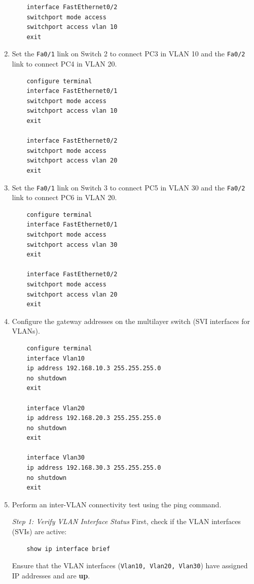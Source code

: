 \documentclass[a4paper]{book}
\begin{document}
\begin{enumerate}
\begin{lstlisting}
    interface FastEthernet0/2
    switchport mode access
    switchport access vlan 10
    exit
    \end{lstlisting}
    \item Set the \texttt{Fa0/1} link on Switch 2 to connect PC3 in VLAN 10 and the \texttt{Fa0/2} link to connect PC4 in VLAN 20.
    \begin{lstlisting}
    configure terminal
    interface FastEthernet0/1
    switchport mode access
    switchport access vlan 10
    exit

    interface FastEthernet0/2
    switchport mode access
    switchport access vlan 20
    exit
    \end{lstlisting}
    \item Set the \texttt{Fa0/1} link on Switch 3 to connect PC5 in VLAN 30 and the \texttt{Fa0/2} link to connect PC6 in VLAN 20.
    \begin{lstlisting}
    configure terminal
    interface FastEthernet0/1
    switchport mode access
    switchport access vlan 30
    exit
        
    interface FastEthernet0/2
    switchport mode access
    switchport access vlan 20
    exit
    \end{lstlisting}
    \item Configure the gateway addresses on the multilayer switch (SVI interfaces for VLANs).
    \begin{lstlisting}
    configure terminal
    interface Vlan10
    ip address 192.168.10.3 255.255.255.0
    no shutdown
    exit
        
    interface Vlan20
    ip address 192.168.20.3 255.255.255.0
    no shutdown
    exit
        
    interface Vlan30
    ip address 192.168.30.3 255.255.255.0
    no shutdown
    exit
    \end{lstlisting}
    \item Perform an inter-VLAN connectivity test using the ping command.
    
    \textit{Step 1: Verify VLAN Interface Status}
    \newline
    \newline
    First, check if the VLAN interfaces (SVIs) are active:
    \begin{lstlisting}
    show ip interface brief
    \end{lstlisting}
    Ensure that the VLAN interfaces (\texttt{Vlan10, Vlan20, Vlan30}) have assigned IP addresses and are \textbf{up}.
    

\end{enumerate}
\end{document}

